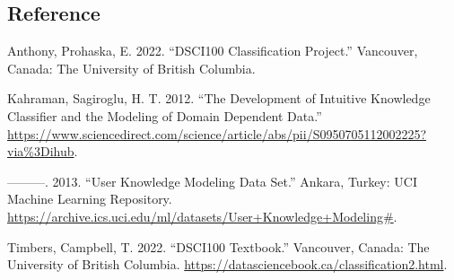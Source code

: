 \documentclass[
  letterpaper,
  DIV=11,
  numbers=noendperiod]{scrartcl}
\newlength{\cslhangindent}
\newenvironment{CSLReferences}[2] %
 {\begin{list}{}{%
  \setlength{\itemindent}{0pt}
  \setlength{\leftmargin}{0pt}
  \setlength{\parsep}{0pt}
  \ifodd #1
   \setlength{\leftmargin}{\cslhangindent}
   \setlength{\itemindent}{-1\cslhangindent}
  \fi
  \setlength{\itemsep}{#2\baselineskip}}}
 {\end{list}}
\begin{document}
\subsection*{Reference}\label{reference}

\label{refs}
\begin{CSLReferences}{1}{0}
Anthony, Prohaska, E. 2022. {``DSCI100 Classification Project.''}
Vancouver, Canada: The University of British Columbia.

Kahraman, Sagiroglu, H. T. 2012. {``The Development of Intuitive
Knowledge Classifier and the Modeling of Domain Dependent Data.''}
\url{https://www.sciencedirect.com/science/article/abs/pii/S0950705112002225?via\%3Dihub}.

---------. 2013. {``User Knowledge Modeling Data Set.''} Ankara, Turkey:
UCI Machine Learning Repository.
\url{https://archive.ics.uci.edu/ml/datasets/User+Knowledge+Modeling\#}.

Timbers, Campbell, T. 2022. {``DSCI100 Textbook.''} Vancouver, Canada:
The University of British Columbia.
\url{https://datasciencebook.ca/classification2.html}.

\end{CSLReferences}
\end{document}
